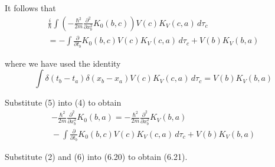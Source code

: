 \documentclass[12pt]{article}
\begin{document}
It follows that
\begin{multline*}
\frac{i}{\hbar}\int\left(-\frac{\hbar^2}{2m}\frac{\partial^2}{\partial x_b^2}K_0(b,c)\right)
V(c)K_V(c,a)\,d\tau_c
\\
=-\int\frac{\partial}{\partial t_b}K_0(b,c)V(c)K_V(c,a)\,d\tau_c
+V(b)K_V(b,a)
\tag{5}
\end{multline*}

where we have used the identity
\begin{equation*}
\int\delta(t_b-t_a)\delta(x_b-x_a)V(c)K_V(c,a)\,d\tau_c
=V(b)K_V(b,a)
\end{equation*}

Substitute (5) into (4) to obtain
\begin{multline*}
-\frac{\hbar^2}{2m}\frac{\partial^2}{\partial x_b^2}K_0(b,a)
=-\frac{\hbar^2}{2m}\frac{\partial^2}{\partial x_b^2}K_V(b,a)
\\
{}-\int\frac{\partial}{\partial t_b}K_0(b,c)V(c)K_V(c,a)\,d\tau_c
+V(b)K_V(b,a)
\tag{6}
\end{multline*}

Substitute (2) and (6) into (6.20) to obtain (6.21).
\end{document}
